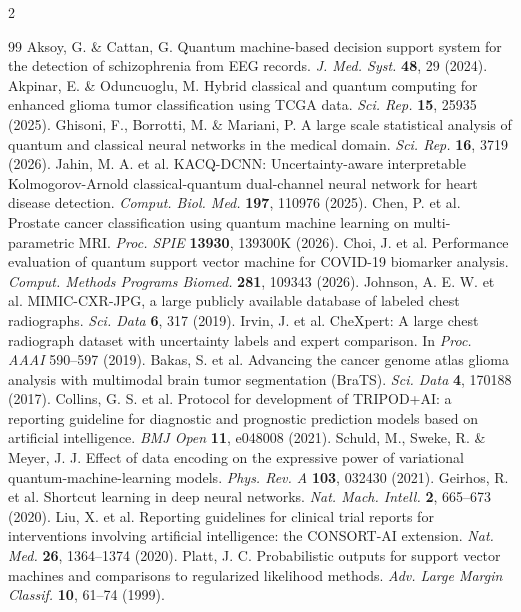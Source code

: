 \documentclass[10pt,a4paper,twoside]{article}
\begin{document}
\begin{multicols}{2}
\begin{thebibliography}{99}
 Aksoy, G. \& Cattan, G. Quantum machine-based decision support system for the detection of schizophrenia from EEG records. \textit{J. Med. Syst.} \textbf{48}, 29 (2024).
 Akpinar, E. \& Oduncuoglu, M. Hybrid classical and quantum computing for enhanced glioma tumor classification using TCGA data. \textit{Sci. Rep.} \textbf{15}, 25935 (2025).
 Ghisoni, F., Borrotti, M. \& Mariani, P. A large scale statistical analysis of quantum and classical neural networks in the medical domain. \textit{Sci. Rep.} \textbf{16}, 3719 (2026).
 Jahin, M. A. et al. KACQ-DCNN: Uncertainty-aware interpretable Kolmogorov-Arnold classical-quantum dual-channel neural network for heart disease detection. \textit{Comput. Biol. Med.} \textbf{197}, 110976 (2025).
 Chen, P. et al. Prostate cancer classification using quantum machine learning on multi-parametric MRI. \textit{Proc. SPIE} \textbf{13930}, 139300K (2026).
 Choi, J. et al. Performance evaluation of quantum support vector machine for COVID-19 biomarker analysis. \textit{Comput. Methods Programs Biomed.} \textbf{281}, 109343 (2026).
 Johnson, A. E. W. et al. MIMIC-CXR-JPG, a large publicly available database of labeled chest radiographs. \textit{Sci. Data} \textbf{6}, 317 (2019).
 Irvin, J. et al. CheXpert: A large chest radiograph dataset with uncertainty labels and expert comparison. In \textit{Proc. AAAI} 590--597 (2019).
 Bakas, S. et al. Advancing the cancer genome atlas glioma analysis with multimodal brain tumor segmentation (BraTS). \textit{Sci. Data} \textbf{4}, 170188 (2017).
 Collins, G. S. et al. Protocol for development of TRIPOD+AI: a reporting guideline for diagnostic and prognostic prediction models based on artificial intelligence. \textit{BMJ Open} \textbf{11}, e048008 (2021).
 Schuld, M., Sweke, R. \& Meyer, J. J. Effect of data encoding on the expressive power of variational quantum-machine-learning models. \textit{Phys. Rev. A} \textbf{103}, 032430 (2021).
 Geirhos, R. et al. Shortcut learning in deep neural networks. \textit{Nat. Mach. Intell.} \textbf{2}, 665--673 (2020).
 Liu, X. et al. Reporting guidelines for clinical trial reports for interventions involving artificial intelligence: the CONSORT-AI extension. \textit{Nat. Med.} \textbf{26}, 1364--1374 (2020).
 Platt, J. C. Probabilistic outputs for support vector machines and comparisons to regularized likelihood methods. \textit{Adv. Large Margin Classif.} \textbf{10}, 61--74 (1999).

\end{thebibliography}
\end{multicols}
\end{document}
